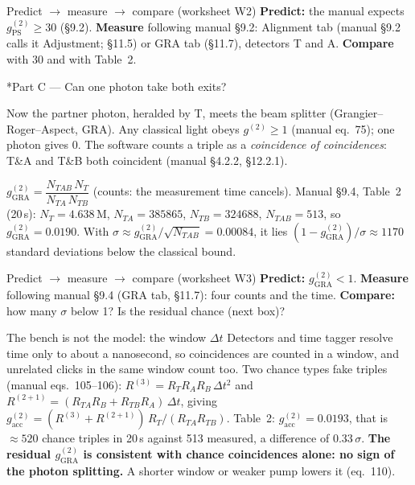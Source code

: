 \documentclass[a4paper,11pt]{article}
\makeatletter
\newcommand{\gtwo}[1]{g^{(2)}_{\mathrm{#1}}}
\renewcommand\section{\@startsection{section}{1}{\z@}{-1.6ex \@plus -.5ex}{0.6ex}{\normalfont\large\bfseries\color{ibmblue}}}
\makeatother
\begin{document}
\begin{pmcbox}{Predict $\rightarrow$ measure $\rightarrow$ compare (worksheet W2)}
\textbf{Predict:} the manual expects $\gtwo{PS} \ge 30$ (\S9.2). \textbf{Measure} following
manual \S9.2: Alignment tab (manual \S9.2 calls it Adjustment; \S11.5) or GRA tab
(\S11.7), detectors T and A. \textbf{Compare} with 30 and with Table~2.
\end{pmcbox}

\section*{Part C --- Can one photon take both exits?}

Now the partner photon, heralded by T, meets the beam splitter (Grangier--Roger--Aspect,
GRA). Any classical light obeys $g^{(2)} \ge 1$ (manual eq.~75); one photon gives 0. The
software counts a triple as a \emph{coincidence of coincidences}: T\&A and T\&B both
coincident (manual \S4.2.2, \S12.2.1).

\begin{numberbox}
$\gtwo{GRA} = \dfrac{N_{TAB}\,N_T}{N_{TA}\,N_{TB}}$ (counts: the measurement time cancels).
Manual \S9.4, Table~2 (20\,s): $N_T = 4.638$\,M, $N_{TA} = 385865$, $N_{TB} = 324688$,
$N_{TAB} = 513$, so $\gtwo{GRA} = 0.0190$. With
$\sigma \approx \gtwo{GRA}/\sqrt{N_{TAB}} = 0.00084$, it lies
$(1 - \gtwo{GRA})/\sigma \approx 1170$ standard deviations below the classical bound.
\end{numberbox}

\begin{pmcbox}{Predict $\rightarrow$ measure $\rightarrow$ compare (worksheet W3)}
\textbf{Predict:} $\gtwo{GRA} < 1$. \textbf{Measure} following manual \S9.4 (GRA tab,
\S11.7): four counts and the time. \textbf{Compare:} how many $\sigma$ below 1? Is the
residual chance (next box)?
\end{pmcbox}

\begin{devbox}{The bench is not the model: the window $\Delta t$}
Detectors and time tagger resolve time only to about a nanosecond, so coincidences are
counted in a window, and unrelated clicks in the same window count too. Two chance types
fake triples (manual eqs.~105--106): $R^{(3)} = R_T R_A R_B\,\Delta t^2$ and
$R^{(2+1)} = (R_{TA} R_B + R_{TB} R_A)\,\Delta t$, giving
$g^{(2)}_{\mathrm{acc}} = (R^{(3)} + R^{(2+1)})\,R_T/(R_{TA} R_{TB})$. Table~2:
$g^{(2)}_{\mathrm{acc}} = 0.0193$, that is $\approx 520$ chance triples in 20\,s against
513 measured, a difference of 0.33\,$\sigma$. \textbf{The residual $\gtwo{GRA}$ is
consistent with chance coincidences alone: no sign of the photon splitting.} A shorter window or weaker pump lowers it (eq.~110).
\end{devbox}
\end{document}
